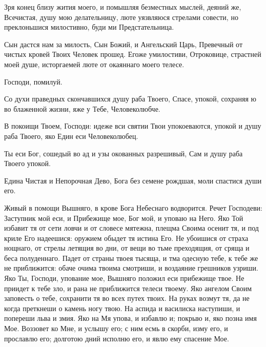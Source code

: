 \begin{mymulticols}
\slava

Зря конец близу жития моего, и помышляя безместных мыслей, деяний же, Всечистая, душу мою делательницу, люте уязвляюся стрелами совести, но преклоньшися милостивно, буди ми Предстательница.

\inyne

Сын дастся нам за милость, Сын Божий, и Ангельский Царь, Превечный от чистых кровей Твоих Человек прошед. Егоже умилостиви, Отроковице, страстней моей душе, исторгаемей люте от окаяннаго моего телесе.

 \Chestneyshuyu

\end{mymulticols}

\mychapterending

\begin{mymulticols}

\TrisviatoePoOtcheNash

Господи, помилуй. 

\vspace{\baselineskip}

Со духи праведных скончавшихся душу раба Твоего, Спасе, упокой, сохраняя ю во блаженной жизни, яже у Тебе, Человеколюбче.

В покоищи Твоем, Господи: идеже вси святии Твои упокоеваются, упокой и душу раба Твоего, яко Един еси Человеколюбец.

\slava

Ты еси Бог, сошедый во ад и узы окованных разрешивый, Сам и душу раба Твоего упокой.

\inyne

Едина Чистая и Непорочная Дево, Бога без семене рождшая, моли спастися души его.

\vspace{\baselineskip}

Живый в помощи Вышняго, в крове Бога Небеснаго водворится. Речет Господеви: Заступник мой еси, и Прибежище мое, Бог мой, и уповаю на Него. Яко Той избавит тя от сети ловчи и от словесе мятежна, плещма Своима осенит тя, и под криле Его надеешися: оружием обыдет тя истина Его. Не убоишися от страха нощнаго, от стрелы летящия во дни, от вещи во тьме преходящия, от сряща и беса полуденнаго. Падет от страны твоея тысяща, и тма одесную тебе, к тебе же не приближится: обаче очима твоима смотриши, и воздаяние грешников узриши. Яко Ты, Господи, упование мое, Вышняго положил еси прибежище твое. Не приидет к тебе зло, и рана не приближится телеси твоему. Яко ангелом Своим заповесть о тебе, сохранити тя во всех путех твоих. На руках возмут тя, да не когда преткнеши о камень ногу твою. На аспида и василиска наступиши, и попереши льва и змия. Яко на Мя упова, и избавлю и; покрыю и, яко позна имя Мое. Воззовет ко Мне, и услышу его; с ним есмь в скорби, изму его, и прославлю его; долготою дний исполню его, и явлю ему спасение Мое.


\end{mymulticols}
